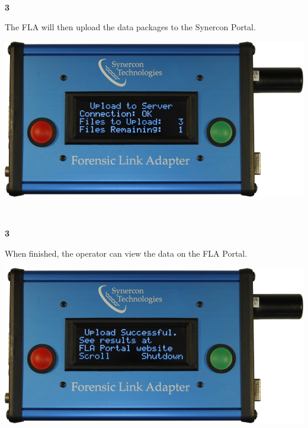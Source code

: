 \documentclass[11pt, oneside]{book}
\begin{document}
\\[\baselineskip]
\noindent\begin{minipage}{0.45\textwidth}%
\begin{center}
\textbf{3}\\[\baselineskip]
\end{center}
The FLA will then upload the data packages to the Synercon Portal.
\end{minipage}%
\hfill%
\begin{minipage}{0.45\textwidth}
\includegraphics[width=\linewidth]{../media/fla_screens/ethernet_and_others/main/upload_data_in_progress}
\end{minipage}
\\[\baselineskip]
\noindent\begin{minipage}{0.45\textwidth}%
\begin{center}
\textbf{3}\\[\baselineskip]
\end{center}
When finished, the operator can view the data on the FLA Portal.
\end{minipage}%
\hfill%
\begin{minipage}{0.45\textwidth}
\includegraphics[width=\linewidth]{../media/fla_screens/ethernet_and_others/main/upload_data_complete}
\end{minipage}
\end{document}
